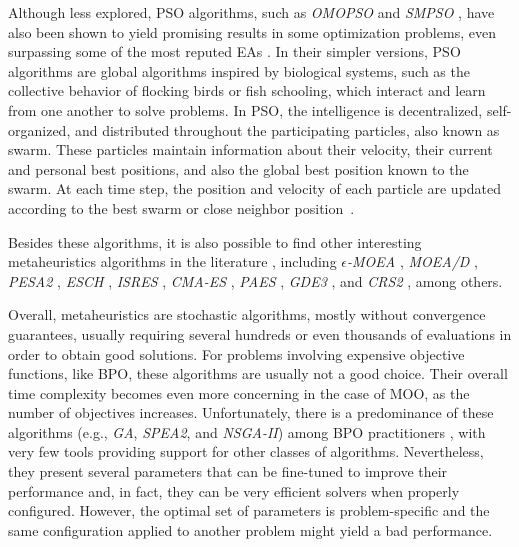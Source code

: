 	Although less explored, \ac{PSO} algorithms, such as \textit{OMOPSO} and \textit{SMPSO} \cite{Sierra2005OMOPSO,SMPSO}, have also been shown to yield promising results in some optimization problems, even surpassing some of the most reputed \acp{EA} \cite{Durillo2011SMPSO}. In their simpler versions, \ac{PSO} algorithms are global algorithms inspired by biological systems, such as the collective behavior of flocking birds or fish schooling, which interact and learn from one another to solve problems. In \ac{PSO}, the intelligence is decentralized, self-organized, and distributed throughout the participating particles, also known as swarm. These particles maintain information about their velocity, their current and personal best positions, and also the global best position known to the swarm. At each time step, the position and velocity of each particle are updated according to the best swarm or close neighbor position~\cite{Brownlee2011}.
	
	Besides these algorithms, it is also possible to find other interesting metaheuristics algorithms in the literature \cite{Zavala2014, Wortmann2017GABESTCHOICE}, including $\epsilon$\textit{-MOEA} \cite{Deb2003EpsMOEA}, \textit{MOEA/D} \cite{Zhang2007MOEAD}, \textit{PESA2} \cite{Corne2001}, \textit{ESCH} \cite{Santos2010}, \textit{ISRES} \cite{Runarsson2000}, \textit{CMA-ES} \cite{Hansen2006}, \textit{PAES} \cite{Knowles1999}, \textit{GDE3} \cite{GDE3}, and \textit{CRS2} \cite{Kaelo2006CRS2}, among others.
	
	Overall, metaheuristics are stochastic algorithms, mostly without convergence guarantees, usually requiring several hundreds or even thousands of evaluations in order to obtain good solutions. For problems involving expensive objective functions, like \ac{BPO}, these algorithms are usually not a good choice. Their overall time complexity becomes even more concerning in the case of \ac{MOO}, as the number of objectives increases. Unfortunately, there is a predominance of these algorithms (e.g., \textit{\ac{GA}}, \textit{\ac{SPEA2}}, and \textit{\ac{NSGA-II}}) among \ac{BPO} practitioners \cite{Wortmann2017GABESTCHOICE}, with very few tools providing support for other classes of algorithms. Nevertheless, they present several parameters that can be fine-tuned to improve their performance and, in fact, they can be very efficient solvers when properly configured. However, the optimal set of parameters is problem-specific and the same configuration applied to another problem might yield a bad performance.
	
